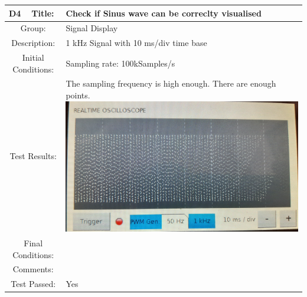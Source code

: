 \documentclass[12pt]{article}
\begin{document}
		\begin{table}[H]
	\begin{center}
		\begin{tabular}{| m{2cm}|m{2cm}|m{12cm}|}
			\hline 
			\bf D4&\bf Title:&\bf Check if Sinus wave can be correclty visualised\\ 
			\hline 
			\multicolumn{2}{|c|}{Group:}&Signal Display\\ 
			\hline 
			\multicolumn{2}{|c|}{Description:}&1 kHz Signal with 10 ms/div time base\\ 
			\hline 
			\multicolumn{2}{|c|}{Initial Conditions:}&Sampling rate: 100kSamples/s\\ 
			\hline 
			\multicolumn{2}{|c|}{Test Results:}&The sampling frequency is high enough. There are enough points.
			\includegraphics[scale=0.08]{Ressources/sinus_10ms}\\ 
			\hline 
			\multicolumn{2}{|c|}{Final Conditions:}&\\ 
			\hline 
			\multicolumn{2}{|c|}{Comments:}&\\ 
			\hline 
			\multicolumn{2}{|c|}{Test Passed:}&Yes \\ 
			\hline 
		\end{tabular} 
	\end{center}
\end{table}	
\end{document}
